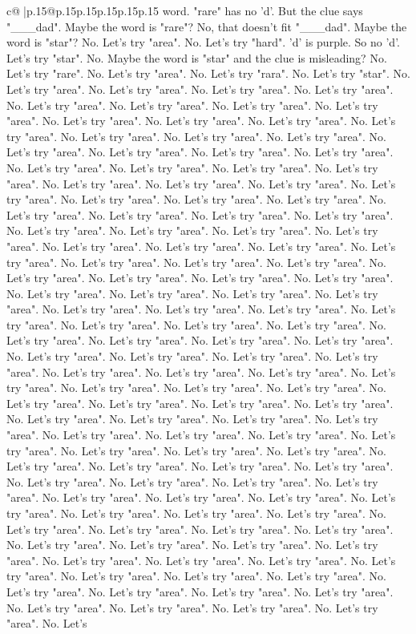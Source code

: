 \documentclass{article}
\begin{document}
{\begin{supertabular}{c@{$\;$}|p{.15\linewidth}@{}p{.15\linewidth}p{.15\linewidth}p{.15\linewidth}p{.15\linewidth}p{.15\linewidth}}
{{{word. "rare" has no 'd'. But the clue says "\_\_\_dad". Maybe the word is "rare"? No, that doesn't fit "\_\_\_dad". Maybe the word is "star"? No. Let's try "area". No. Let's try "hard". 'd' is purple. So no 'd'. Let's try "star". No. Maybe the word is "star" and the clue is misleading? No. Let's try "rare". No. Let's try "area". No. Let's try "rara". No. Let's try "star". No. Let's try "area". No. Let's try "area". No. Let's try "area". No. Let's try "area". No. Let's try "area". No. Let's try "area". No. Let's try "area". No. Let's try "area". No. Let's try "area". No. Let's try "area". No. Let's try "area". No. Let's try "area". No. Let's try "area". No. Let's try "area". No. Let's try "area". No. Let's try "area". No. Let's try "area". No. Let's try "area". No. Let's try "area". No. Let's try "area". No. Let's try "area". No. Let's try "area". No. Let's try "area". No. Let's try "area". No. Let's try "area". No. Let's try "area". No. Let's try "area". No. Let's try "area". No. Let's try "area". No. Let's try "area". No. Let's try "area". No. Let's try "area". No. Let's try "area". No. Let's try "area". No. Let's try "area". No. Let's try "area". No. Let's try "area". No. Let's try "area". No. Let's try "area". No. Let's try "area". No. Let's try "area". No. Let's try "area". No. Let's try "area". No. Let's try "area". No. Let's try "area". No. Let's try "area". No. Let's try "area". No. Let's try "area". No. Let's try "area". No. Let's try "area". No. Let's try "area". No. Let's try "area". No. Let's try "area". No. Let's try "area". No. Let's try "area". No. Let's try "area". No. Let's try "area". No. Let's try "area". No. Let's try "area". No. Let's try "area". No. Let's try "area". No. Let's try "area". No. Let's try "area". No. Let's try "area". No. Let's try "area". No. Let's try "area". No. Let's try "area". No. Let's try "area". No. Let's try "area". No. Let's try "area". No. Let's try "area". No. Let's try "area". No. Let's try "area". No. Let's try "area". No. Let's try "area". No. Let's try "area". No. Let's try "area". No. Let's try "area". No. Let's try "area". No. Let's try "area". No. Let's try "area". No. Let's try "area". No. Let's try "area". No. Let's try "area". No. Let's try "area". No. Let's try "area". No. Let's try "area". No. Let's try "area". No. Let's try "area". No. Let's try "area". No. Let's try "area". No. Let's try "area". No. Let's try "area". No. Let's try "area". No. Let's try "area". No. Let's try "area". No. Let's try "area". No. Let's try "area". No. Let's try "area". No. Let's try "area". No. Let's try "area". No. Let's try "area". No. Let's try "area". No. Let's try "area". No. Let's try "area". No. Let's try "area". No. Let's try "area". No. Let's try "area". No. Let's try "area". No. Let's try "area". No. Let's try "area". No. Let's try "area". No. Let's try "area". No. Let's try "area". No. Let's try "area". No. Let's try "area". No. Let's try "area". No. Let's try "area". No. Let's try "area". No. Let's try "area". No. Let's try "area". No. Let's try "area". No. Let's try "area". No. Let's try "area". No. Let's try "area". No. Let's try "area". No. Let's try "area". No. Let's try "area". No. Let's }}}
\end{supertabular}}
\end{document}
